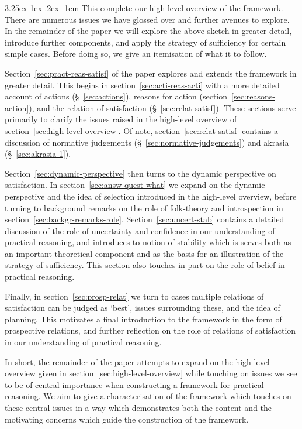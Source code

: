\documentclass[10pt]{article}
\makeatletter
\renewcommand\paragraph{\@startsection{paragraph}{5}{\z@}%
  {3.25ex \@plus1ex \@minus.2ex}%
  {-1em}%
  {\normalfont\normalsize\bfseries}}
\makeatother
\begin{document}
\paragraph{ }
This complete our high-level overview of the framework.
There are numerous issues we have glossed over and further avenues to explore.
In the remainder of the paper we will explore the above sketch in greater detail, introduce further components, and apply the strategy of sufficiency for certain simple cases.
Before doing so, we give an itemisation of what it to follow.

Section~\ref{sec:pract-reas-satisf} of the paper explores and extends the framework in greater detail.
This begins in section~\ref{sec:acti-reas-acti} with a more detailed account of actions (\S~\ref{sec:actions}), reasons for action (section~\ref{sec:reasons-action}), and the relation of satisfaction (\S~\ref{sec:relat-satisf}).
These sections serve primarily to clarify the issues raised in the high-level overview of section~\ref{sec:high-level-overview}.
Of note, section~\ref{sec:relat-satisf} contains a discussion of normative judgements (\S~\ref{sec:normative-judgements}) and akrasia (\S~\ref{sec:akrasia-1}).

Section~\ref{sec:dynamic-perspective} then turns to the dynamic perspective on satisfaction.
In section~\ref{sec:answ-quest-what} we expand on the dynamic perspective and the idea of selection introduced in the high-level overview, before turning to background remarks on the role of folk-theory and introspection in section~\ref{sec:backgr-remarks-role}.
Section~\ref{sec:uncert-stab} contains a detailed discussion of the role of uncertainty and confidence in our understanding of practical reasoning, and introduces to notion of stability which is serves both as an important theoretical component and as the basis for an illustration of the strategy of sufficiency.
This section also touches in part on the role of belief in practical reasoning.

Finally, in section~\ref{sec:prosp-relat} we turn to cases multiple relations of satisfaction can be judged as ‘best’, issues surrounding these, and the idea of planning.
This motivates a final introduction to the framework in the form of prospective relations, and further reflection on the role of relations of satisfaction in our understanding of practical reasoning.

In short, the remainder of the paper attempts to expand on the high-level overview given in section~\ref{sec:high-level-overview} while touching on issues we see to be of central importance when constructing a framework for practical reasoning.
We aim to give a characterisation of the framework which touches on these central issues in a way which demonstrates both the content and the motivating concerns which guide the construction of the framework.
\end{document}

